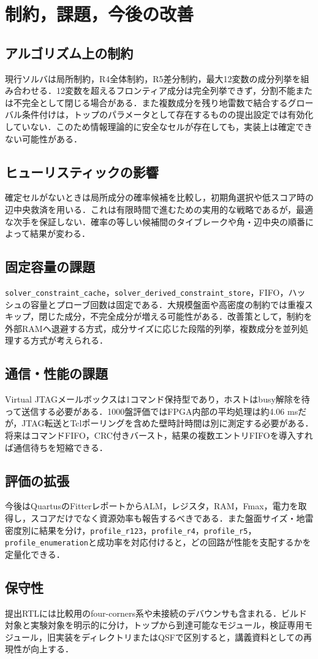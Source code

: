 \chapter{制約，課題，今後の改善}
\label{chap:limitations}

\section{アルゴリズム上の制約}
現行ソルバは局所制約，R4全体制約，R5差分制約，最大12変数の成分列挙を組み合わせる．12変数を超えるフロンティア成分は完全列挙できず，分割不能または不完全として閉じる場合がある．また複数成分を残り地雷数で結合するグローバル条件付けは，トップのパラメータとして存在するものの提出設定では有効化していない．このため情報理論的に安全なセルが存在しても，実装上は確定できない可能性がある．

\section{ヒューリスティックの影響}
確定セルがないときは局所成分の確率候補を比較し，初期角選択や低スコア時の辺中央救済を用いる．これは有限時間で進むための実用的な戦略であるが，最適な次手を保証しない．確率の等しい候補間のタイブレークや角・辺中央の順番によって結果が変わる．

\section{固定容量の課題}
\texttt{solver\_constraint\_cache}，\texttt{solver\_derived\_constraint\_store}，FIFO，ハッシュの容量とプローブ回数は固定である．大規模盤面や高密度の制約では重複スキップ，閉じた成分，不完全成分が増える可能性がある．改善策として，制約を外部RAMへ退避する方式，成分サイズに応じた段階的列挙，複数成分を並列処理する方式が考えられる．

\section{通信・性能の課題}
Virtual JTAGメールボックスは1コマンド保持型であり，ホストはbusy解除を待って送信する必要がある．1000盤評価ではFPGA内部の平均処理は約4.06 msだが，JTAG転送とTclポーリングを含めた壁時計時間は別に測定する必要がある．将来はコマンドFIFO，CRC付きバースト，結果の複数エントリFIFOを導入すれば通信待ちを短縮できる．

\section{評価の拡張}
今後はQuartusのFitterレポートからALM，レジスタ，RAM，Fmax，電力を取得し，スコアだけでなく資源効率も報告するべきである．また盤面サイズ・地雷密度別に結果を分け，\texttt{profile\_r123}，\texttt{profile\_r4}，\texttt{profile\_r5}，\texttt{profile\_enumeration}と成功率を対応付けると，どの回路が性能を支配するかを定量化できる．

\section{保守性}
提出RTLには比較用のfour-corners系や未接続のデバウンサも含まれる．ビルド対象と実験対象を明示的に分け，トップから到達可能なモジュール，検証専用モジュール，旧実装をディレクトリまたはQSFで区別すると，講義資料としての再現性が向上する．
